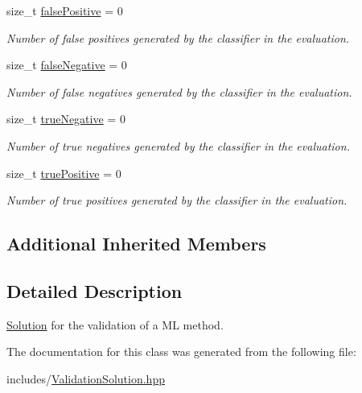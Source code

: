 \begin{DoxyCompactItemize}
\mbox{\label{class_validation_solution_a936e73dc0d14121304e7031593bd842f}} 
size\+\_\+t \mbox{\hyperlink{class_validation_solution_a936e73dc0d14121304e7031593bd842f}{false\+Positive}} = 0
\begin{DoxyCompactList}\small\item\em Number of false positives generated by the classifier in the evaluation. \end{DoxyCompactList}\item 
\mbox{\label{class_validation_solution_a654bec4c5a19b8474e784f0bf609c5b8}} 
size\+\_\+t \mbox{\hyperlink{class_validation_solution_a654bec4c5a19b8474e784f0bf609c5b8}{false\+Negative}} = 0
\begin{DoxyCompactList}\small\item\em Number of false negatives generated by the classifier in the evaluation. \end{DoxyCompactList}\item 
\mbox{\label{class_validation_solution_aa074673534cfc23d82a06e82576f836f}} 
size\+\_\+t \mbox{\hyperlink{class_validation_solution_aa074673534cfc23d82a06e82576f836f}{true\+Negative}} = 0
\begin{DoxyCompactList}\small\item\em Number of true negatives generated by the classifier in the evaluation. \end{DoxyCompactList}\item 
\mbox{\label{class_validation_solution_a84e59f55bf7e2b296eb21977828d9f07}} 
size\+\_\+t \mbox{\hyperlink{class_validation_solution_a84e59f55bf7e2b296eb21977828d9f07}{true\+Positive}} = 0
\begin{DoxyCompactList}\small\item\em Number of true positives generated by the classifier in the evaluation. \end{DoxyCompactList}\end{DoxyCompactItemize}
\subsection*{Additional Inherited Members}


\subsection{Detailed Description}
\mbox{\hyperlink{class_solution}{Solution}} for the validation of a ML method. 

The documentation for this class was generated from the following file\+:\begin{DoxyCompactItemize}
\item 
includes/\mbox{\hyperlink{_validation_solution_8hpp}{Validation\+Solution.\+hpp}}\end{DoxyCompactItemize}
